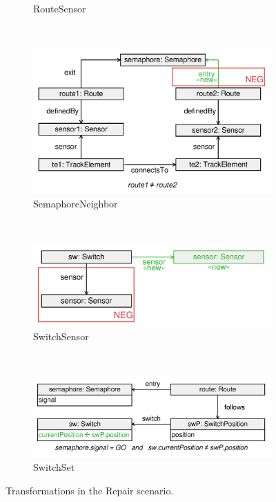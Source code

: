 \begin{itemize}
\begin{figure}
\begin{subfigure}[b]{\textwidth}
                \caption{\textsf{RouteSensor}}
                \label{fig:transformation-repair-routesensor}
        \end{subfigure}
        ~
        \begin{subfigure}[b]{\textwidth}
                \centering
                \includegraphics[scale=0.2]{figures/transformation-repair-semaphoreneighbor}
                \caption{\textsf{SemaphoreNeighbor}}
                \label{fig:transformation-repair-semaphoreneighbor}
        \end{subfigure}
        ~
        \begin{subfigure}[b]{\textwidth}
                \centering
                \includegraphics[scale=0.2]{figures/transformation-repair-switchsensor}
                \caption{\textsf{SwitchSensor}}
                \label{fig:transformation-repair-switchsensor}
        \end{subfigure}        
        ~
        \begin{subfigure}[b]{\textwidth}
                \centering
                \includegraphics[scale=0.2]{figures/transformation-repair-switchset}
                \caption{\textsf{SwitchSet}}
                \label{fig:transformation-repair-switchset}
        \end{subfigure}
        \caption{Transformations in the \textsf{Repair} scenario.}
        \label{fig:transformations-repair}
\end{figure}
  

\end{itemize}
